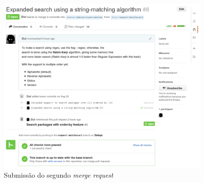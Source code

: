 \begin{figure}[h]
  \centering
	\includegraphics[width=0.95\textwidth]{figuras/pr2}
  \caption{Submissão do segundo \textit{merge request}}
  \label{fig:pr2_travisok}
\end{figure}


